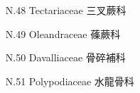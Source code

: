 \begin{enumerate}
\begin{enumerate}
        
      \item[N.48] Tectariaceae 三叉蕨科      
        
      \item[N.49] Oleandraceae 蓧蕨科      
        
      \item[N.50] Davalliaceae 骨碎補科      
        
      \item[N.51] Polypodiaceae 水龍骨科      
        
    \end{enumerate}
\end{enumerate}
\vspace{2ex} 

